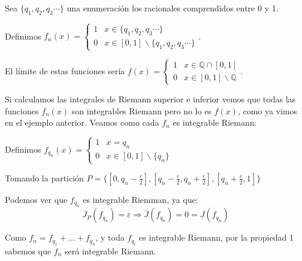 \documentclass{apuntes}
\begin{document}
\begin{example}
Sea $\lbrace q_1, q_2, q_3 \cdots \rbrace$ una enumeración los racionales comprendidos entre 0 y 1.

Definimos $f_n(x)=\begin{cases}
   1 &  x \in \lbrace q_1, q_2, q_3 \cdots \rbrace \\
   0       &  x \in [0,1] \backslash \lbrace q_1, q_2, q_3 \cdots \rbrace
  \end{cases}$.
  
El límite de estas funciones sería $f(x)=\begin{cases}
   1 &  x \in \mathbb{Q} \cap [0,1] \\
   0       &  x \in [0,1] \backslash \mathbb{Q}
  \end{cases}$.

Si calculamos las integrales de Riemann superior e inferior vemos que todas las funciones $f_n(x)$ son integrables Riemann pero no lo es $f(x)$, como ya vimos en el ejemplo anterior. Veamos como cada $f_n$ es integrable Riemann:%


Definimos $f_{q_n}(x) =\begin{cases}
	1 & x = q_n\\
	0 & x \in [0,1] \backslash \{q_n\}
	\end{cases}
$

Tomando la partición
$P = \{ [0, q_n - \frac{\varepsilon}{2}], [q_n - \frac{\varepsilon}{2}, q_n + \frac{\varepsilon}{2}], [q_n + \frac{\varepsilon}{2}, 1] \}$


Podemos ver que $f_{q_n}$ es integrable Riemman, ya que:
\[\overline{J}_P (f_{q_n}) = \varepsilon \Rightarrow \overline{J} (f_{q_n}) = 0 = \underline{J} (f_{q_n})\]

Como $f_n = f_{q_1} + \ldots + f_{q_n}$, y toda $ f_{q_i}$ es integrable Riemann, por la propiedad 1 sabemos que $f_n$ será integrable Riemann.
\end{example}
\end{document}
